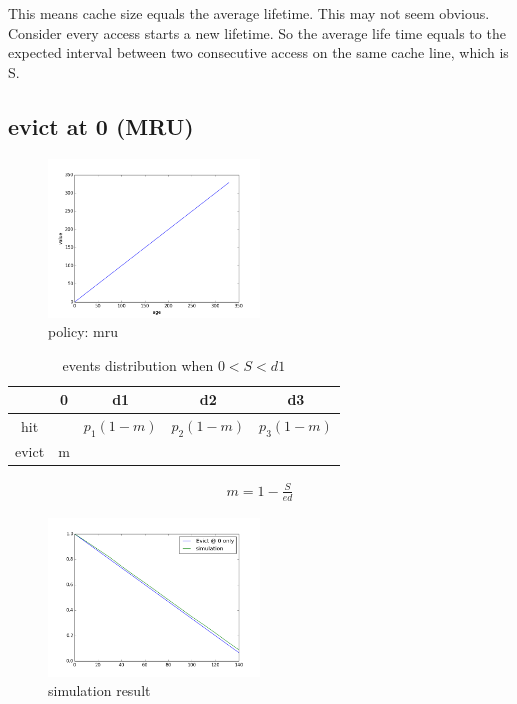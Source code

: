 \documentclass[12pt, letterpaper]{article}
\begin{document}
This means cache size equals the average lifetime. This may not seem obvious.
Consider every access starts a new lifetime. So the average life time equals to
the expected interval between two consecutive access on the same cache line,
which is S.

\subsection{evict at 0 (MRU)}

\begin{figure}[H]
\centering
\includegraphics[width=0.5\textwidth]{mru_value}
\caption{policy: mru}
\end{figure}

\begin{table}[H]
\begin{center}
\begin{tabular}{c|c c c c}
\hline
 & 0 & d1 & d2 & d3 \\
 \hline
hit & & $p_1 (1-m)$ & $p_2(1-m)$ & $p_3(1-m)$ \\
evict & m & & & 
\end{tabular}
\caption{events distribution when $0<S<d1$}
\end{center}
\end{table}

\begin{equation}
\begin{aligned}
m = 1 - \frac{S}{ed}
\end{aligned}
\end{equation}

\begin{figure}[H]
\centering
\includegraphics[width=0.5\textwidth]{sim_mru}
\caption{simulation result}
\end{figure}
\end{document}
